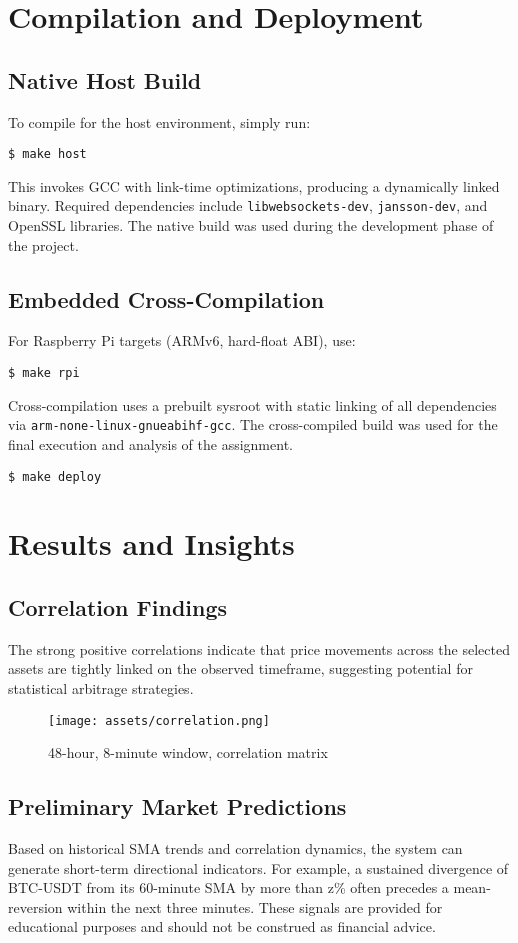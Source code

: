 \documentclass{article}
\begin{document}
\section{Compilation and Deployment}

\subsection{Native Host Build}
To compile for the host environment, simply run:
\begin{verbatim}
$ make host
\end{verbatim}
This invokes GCC with link-time optimizations, producing a dynamically linked binary. Required dependencies include \texttt{libwebsockets-dev}, \texttt{jansson-dev}, and OpenSSL libraries. The native build was used during the development phase of the project.

\subsection{Embedded Cross-Compilation}
For Raspberry Pi targets (ARMv6, hard-float ABI), use:
\begin{verbatim}
$ make rpi
\end{verbatim}
Cross-compilation uses a prebuilt sysroot with static linking of all dependencies via \texttt{arm-none-linux-gnueabihf-gcc}. The cross-compiled build was used for the final execution and analysis of the assignment. 
\begin{verbatim}
$ make deploy
\end{verbatim}

\section{Results and Insights}

\subsection{Correlation Findings}
The strong positive correlations indicate that price movements across the selected assets are tightly linked on the observed timeframe, suggesting potential for statistical arbitrage strategies.
\begin{figure}[h]
  \centering
  \texttt{[image: assets/correlation.png]}
  \caption{48-hour, 8-minute window, correlation matrix}
\end{figure}

\subsection{Preliminary Market Predictions}
Based on historical SMA trends and correlation dynamics, the system can generate short-term directional indicators. For example, a sustained divergence of BTC-USDT from its 60-minute SMA by more than z\% often precedes a mean-reversion within the next three minutes. These signals are provided for educational purposes and should not be construed as financial advice.
\end{document}

